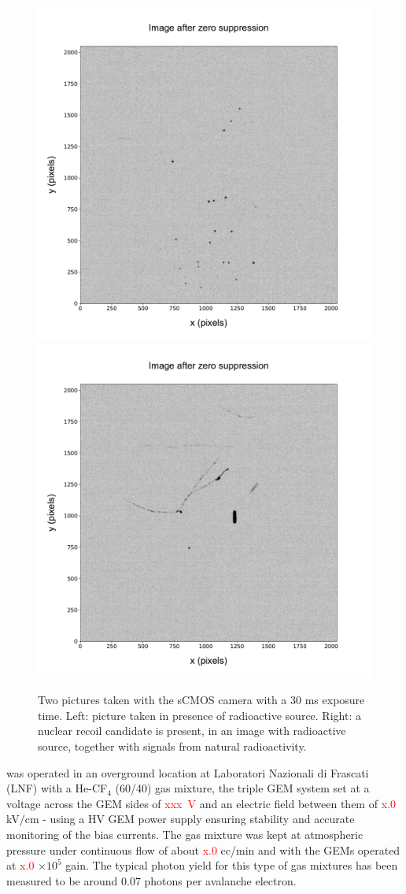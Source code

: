 \documentclass[12pt]{iopart}
\begin{document}
 
\begin{figure}[ht]
  \begin{center}
    \includegraphics[width=0.49\linewidth]{figures/pic_run01843_ev93_oriIma_paper}
    \includegraphics[width=0.49\linewidth]{figures/pic_run02317_ev342_oriIma_paper}
    \caption{Two pictures taken with the sCMOS camera with a 30 ms
      exposure time. Left: picture taken in presence of \fe radioactive
      source. Right: a nuclear recoil candidate is present, in an image
      with \ambe radioactive source, together with signals from natural
      radioactivity.      \label{fig:signals}}
  \end{center}
\end{figure}

\lemon was operated in an overground location at Laboratori Nazionali di Frascati (LNF) with  a He-CF$_4$ (60/40) gas mixture, the triple GEM system set at a voltage across the GEM sides of \textcolor{red}{xxx~V} and an electric field between them of \textcolor{red}{x.0} kV/cm - using a HV GEM power supply \cite{Corradi:2007df} ensuring stability and accurate monitoring of the bias currents. The gas mixture was kept at atmospheric pressure under continuous flow of about \textcolor{red}{x.0} cc/min and with the GEMs operated at \textcolor{red}{x.0} $ \times10^5$ gain. The typical photon yield for this  type of gas mixtures has been measured to be around  0.07 photons per avalanche electron.\cite{bib:jinst_orange1, bib:roby, bib:tesinatalia}
\end{document}
